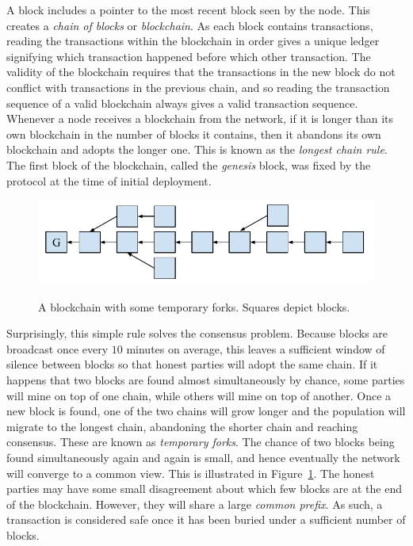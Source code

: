 A block includes a pointer to the most recent block seen by the node. This
creates a \emph{chain of blocks} or \emph{blockchain}. As each block contains
transactions, reading the transactions within the blockchain in order gives a
unique ledger signifying which transaction happened before which other
transaction. The validity of the blockchain requires that the transactions in
the new block do not conflict with transactions in the previous chain, and so
reading the transaction sequence of a valid blockchain always gives a valid
transaction sequence. Whenever a node receives a blockchain from the
network, if it is longer than its own blockchain in the number of blocks it
contains, then it abandons its own blockchain and adopts the longer one. This is
known as the \emph{longest chain rule}. The first block of the blockchain,
called the \emph{genesis} block, was fixed by the protocol at the time of
initial deployment.

\begin{figure}[h]
    \caption{
    A blockchain with some temporary forks. Squares depict blocks.
    }
    \centering
    \includegraphics[width=0.7\columnwidth,keepaspectratio]{chapters/introduction/figures/blockchain.pdf}
    \label{fig.blockchain}
\end{figure}

Surprisingly, this simple rule solves the consensus problem. Because blocks are
broadcast once every $10$ minutes on average, this leaves a sufficient window of
silence between blocks so that honest parties will adopt the same chain. If it
happens that two blocks are found almost simultaneously by chance, some parties
will mine on top of one chain, while others will mine on top of another. Once a
new block is found, one of the two chains will grow longer and the population
will migrate to the longest chain, abandoning the shorter chain and reaching
consensus. These are known as \emph{temporary forks}. The
chance of two blocks being found simultaneously again and again is small, and
hence eventually the network will converge to a common view. This is illustrated
in Figure~\ref{fig.blockchain}. The honest parties may have some small
disagreement about which few blocks are at the end of the blockchain. However,
they will share a large \emph{common prefix}. As such, a transaction is
considered safe once it has been buried under a sufficient number of blocks.

